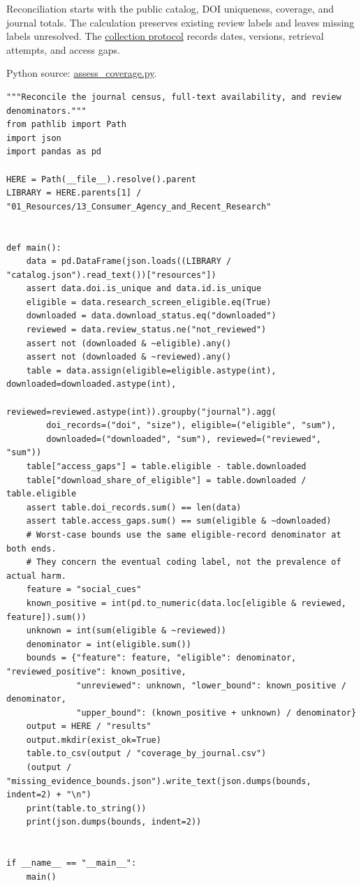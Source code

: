 Reconciliation starts with the public catalog, DOI uniqueness, coverage,
and journal totals. The calculation preserves existing review labels and
leaves missing labels unresolved. The
\href{../01_Resources/13_Consumer_Agency_and_Recent_Research/README.md}{collection
protocol} records dates, versions, retrieval attempts, and access gaps.

\FloatBarrier
{}
Python source:
\href{../03_Data_and_Code/Consumer_Agency_Literature/assess_coverage.py}{assess\_coverage.py}.

\begin{Verbatim}[breaklines,breakanywhere,fontsize=\small]
"""Reconcile the journal census, full-text availability, and review denominators."""
from pathlib import Path
import json
import pandas as pd

HERE = Path(__file__).resolve().parent
LIBRARY = HERE.parents[1] / "01_Resources/13_Consumer_Agency_and_Recent_Research"


def main():
    data = pd.DataFrame(json.loads((LIBRARY / "catalog.json").read_text())["resources"])
    assert data.doi.is_unique and data.id.is_unique
    eligible = data.research_screen_eligible.eq(True)
    downloaded = data.download_status.eq("downloaded")
    reviewed = data.review_status.ne("not_reviewed")
    assert not (downloaded & ~eligible).any()
    assert not (downloaded & ~reviewed).any()
    table = data.assign(eligible=eligible.astype(int), downloaded=downloaded.astype(int),
                        reviewed=reviewed.astype(int)).groupby("journal").agg(
        doi_records=("doi", "size"), eligible=("eligible", "sum"),
        downloaded=("downloaded", "sum"), reviewed=("reviewed", "sum"))
    table["access_gaps"] = table.eligible - table.downloaded
    table["download_share_of_eligible"] = table.downloaded / table.eligible
    assert table.doi_records.sum() == len(data)
    assert table.access_gaps.sum() == sum(eligible & ~downloaded)
    # Worst-case bounds use the same eligible-record denominator at both ends.
    # They concern the eventual coding label, not the prevalence of actual harm.
    feature = "social_cues"
    known_positive = int(pd.to_numeric(data.loc[eligible & reviewed, feature]).sum())
    unknown = int(sum(eligible & ~reviewed))
    denominator = int(eligible.sum())
    bounds = {"feature": feature, "eligible": denominator, "reviewed_positive": known_positive,
              "unreviewed": unknown, "lower_bound": known_positive / denominator,
              "upper_bound": (known_positive + unknown) / denominator}
    output = HERE / "results"
    output.mkdir(exist_ok=True)
    table.to_csv(output / "coverage_by_journal.csv")
    (output / "missing_evidence_bounds.json").write_text(json.dumps(bounds, indent=2) + "\n")
    print(table.to_string())
    print(json.dumps(bounds, indent=2))


if __name__ == "__main__":
    main()
\end{Verbatim}

